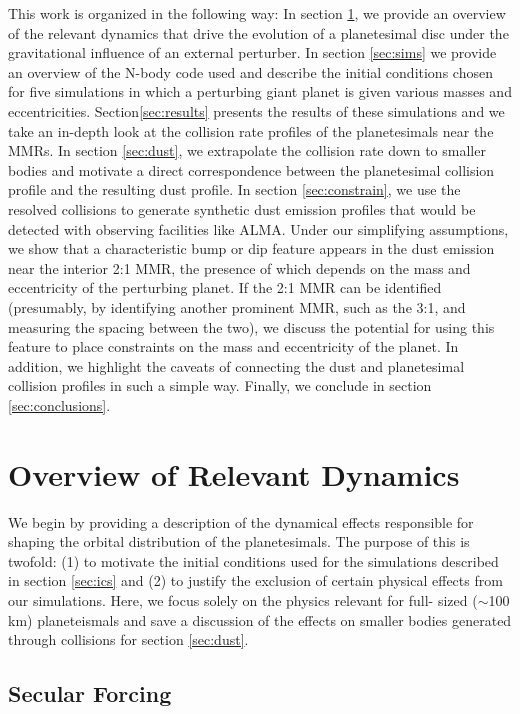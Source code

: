 This work is organized in the following way: In section \ref{sec:dynamics}, we provide an overview of the relevant dynamics that 
drive the evolution of a planetesimal disc under the gravitational influence of an external perturber. In section \ref{sec:sims} we 
provide an overview of the N-body code used and describe the initial conditions chosen for five simulations in which a perturbing 
giant planet is given various masses  and eccentricities. Section\ref{sec:results} presents the results of these simulations and we 
take an in-depth look at the collision rate profiles of the planetesimals near the MMRs. In section \ref{sec:dust},  we extrapolate 
the collision rate down to smaller bodies and motivate a direct correspondence between the planetesimal collision profile and the 
resulting dust profile. In section \ref{sec:constrain}, we use the resolved collisions to generate synthetic dust emission profiles 
that would be detected with observing facilities like ALMA. Under our simplifying assumptions, we show that a characteristic 
bump or dip feature appears in the dust emission near the interior 2:1 MMR, the presence of which depends on the mass and 
eccentricity of the perturbing planet. If the 2:1 MMR can be identified (presumably, by identifying another prominent MMR, such 
as the 3:1, and measuring the spacing between the two), we discuss the potential for using this feature to place constraints on 
the mass and eccentricity of the planet. In addition, we highlight the caveats of connecting the dust and planetesimal collision 
profiles in such a simple way. Finally, we conclude in section \ref{sec:conclusions}.

\section{Overview of Relevant Dynamics} \label{sec:dynamics}

We begin by providing a description of the dynamical effects responsible for shaping the orbital distribution of the planetesimals. 
The purpose of this is twofold: (1) to motivate the initial conditions used for the simulations described in section \ref{sec:ics} and 
(2) to justify the exclusion of certain physical effects from our simulations. Here, we focus solely on the physics relevant for full-
sized ($\sim$100 km) planeteismals and save a discussion of the effects on smaller bodies generated through collisions for 
section \ref{sec:dust}.

\subsection{Secular Forcing}\label{sec:sec_force}

